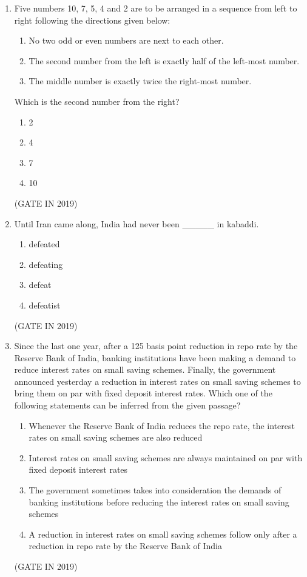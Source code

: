 \documentclass[journal]{IEEEtran}
\begin{document}
\begin{enumerate}
\item Five numbers 10, 7, 5, 4 and 2 are to be arranged in a sequence from left to right following the directions given below:
\begin{enumerate}
\item No two odd or even numbers are next to each other.
\item The second number from the left is exactly half of the left-most number.
\item The middle number is exactly twice the right-most number.
\end{enumerate}
Which is the second number from the right?
\begin{multicols}{4}
\begin{enumerate}
\item 2
\item 4
\item 7
\item 10
\end{enumerate}
\end{multicols} \hfill(GATE IN 2019)

\item Until Iran came along, India had never been \_\_\_\_\_ in kabaddi.
\begin{multicols}{4}
\begin{enumerate}
\item defeated
\item defeating
\item defeat
\item defeatist
\end{enumerate}
\end{multicols} \hfill(GATE IN 2019)

\item Since the last one year, after a 125 basis point reduction in repo rate by the Reserve Bank of India, banking institutions have been making a demand to reduce interest rates on small saving schemes. Finally, the government announced yesterday a reduction in interest rates on small saving schemes to bring them on par with fixed deposit interest rates. Which one of the following statements can be inferred from the given passage?
\begin{enumerate}
\item Whenever the Reserve Bank of India reduces the repo rate, the interest rates on small saving schemes are also reduced
\item Interest rates on small saving schemes are always maintained on par with fixed deposit interest rates
\item The government sometimes takes into consideration the demands of banking institutions before reducing the interest rates on small saving schemes
\item A reduction in interest rates on small saving schemes follow only after a reduction in repo rate by the Reserve Bank of India
\end{enumerate}
 \hfill(GATE IN 2019)


\end{enumerate}
\end{document}
